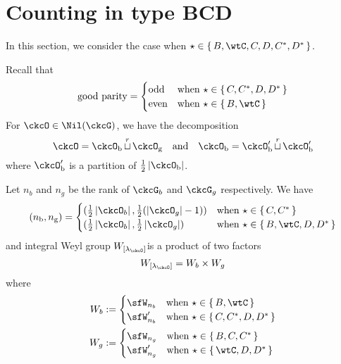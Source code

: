 \documentclass[12pt,a4paper]{amsart}
\def\abs#1{\left|{#1}\right|}
\numberwithin{equation}{section}
\theoremstyle{remark}
\def\half{{\tfrac{1}{2}}}
\def\lamck{\lambda_\ckcO}
\def\Gc{G_\bC}
\def\WLamck{W_{[\lambda_{\ckcO}]}}
\def\Wb{W_{b}}
\def\Wg{W_{g}}
\def\nbb{n_{\mathrm b}}
\def\ngg{n_{\mathrm g}}
\def\AND{\quad \text{and} \quad}
\def\cuprow{{\stackrel{r}{\sqcup}}}
\def\ckstar{{\check \star}}
\def\cuprow{{\,\stackrel{r}{\sqcup}\,}}
\def\ckcOb{\ckcO_{\mathrm b}}
\def\ckcOpb{\ckcO'_{\mathrm b}}
\def\ckcOg{\ckcO_{\mathrm g}}
\begin{document}
%



% 

% 


\section{Counting in type BCD}

In this section, we consider the case when %
$\star \in \set{B,\wtC, C,D,C^{*}, D^{*}}$.


Recall that
\[
  \text{good parity} =
\begin{cases}
 \text{odd} & \text{when } \star \in \set{C,C^{*},D,D^{*}}\\
 \text{even} & \text{when } \star \in \set{B,\wtC}\\
\end{cases}
\]
For $\ckcO\in \Nil(\ckcG)$, we have the decomposition
\[
  \ckcO = \ckcOb\cuprow \ckcOg \AND \ckcOb = \ckcOpb\cuprow \ckcOpb
\]
where $\ckcOpb$ is a partition of $\half\abs{\ckcOb}$.

Let $n_{b}$ and $n_{g}$ be the rank of $\ckcG_{b}$ and $\ckcG_{g}$
respectively. We have
  \[
    (\nbb,\ngg) =
    \begin{cases}
      (\half \abs{\ckcO_{b}}, \half(\abs{\ckcO_{g}}-1)) & \text{when
      } \star \in \set{C,C^{*}}\\
      (\half \abs{\ckcO_{b}}, \half\abs{\ckcO_{g}}) & \text{when
      } \star \in \set{B,\wtC,D,D^{*}}\\
    \end{cases}
  \]
  and integral Weyl group $\WLamck$is a product of two factors
  \[
    W_{[\lamck]} =\Wb\times \Wg
  \]
  where
  \begin{equation}\label{eq:Wbg}
    \begin{split}
    \Wb & := \begin{cases}
      \sfW_{n_{b}}  & \text{when } \star \in \set{B, \wtC} \\
      \sfW'_{n_{b}} & \text{when } \star \in \set{C,C^{*},D,D^{*}}
      \end{cases}\\
    \Wg & := \begin{cases}
      \sfW_{n_{g}}  & \text{when } \star \in \set{B,C, C^{*} } \\
      \sfW'_{n_{g}} & \text{when } \star \in \set{\wtC,D,D^{*}}
      \end{cases}
    \end{split}
  \end{equation}
\end{document}

